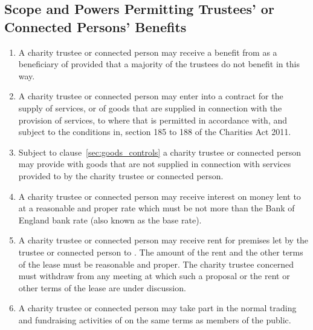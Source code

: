    \subsection{Scope and Powers Permitting Trustees' or Connected Persons' Benefits}\label{sec:permitted_benefits}
    \begin{enumerate}
        \item A charity trustee or connected person may receive a benefit from \shortname{} as a beneficiary of \shortname{} provided that a majority of the trustees do not benefit in this way.
        \item A charity trustee or connected person may enter into a contract for the supply of services, or of goods that are supplied in connection with the provision of services, to \shortname{} where that is permitted in accordance with, and subject to the conditions in, section 185 to 188 of the Charities Act 2011.
        \item\label{item:goods} Subject to clause~\ref{sec:goods_controls} a charity trustee or connected person may provide \shortname{} with goods that are not supplied in connection with services provided to \shortname{} by the charity trustee or connected person.

        \item A charity trustee or connected person may receive interest on money lent to \shortname{} at a reasonable and proper rate which must be not more than the Bank of England bank rate (also known as the base rate).
        \item A charity trustee or connected person may receive rent for premises let by the trustee or connected person to \shortname{}. The amount of the rent and the other terms of the lease must be reasonable and proper. The charity trustee concerned must withdraw from any meeting at which such a proposal or the rent or other terms of the lease are under discussion.
        \item A charity trustee or connected person may take part in the normal trading and fundraising activities of \shortname{} on the same terms as members of the public.
    \end{enumerate}

